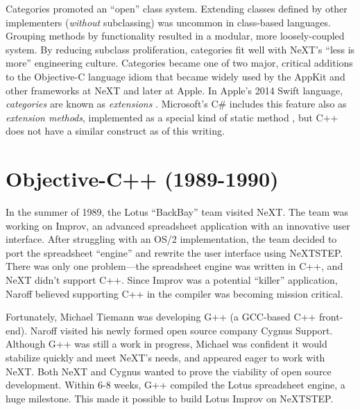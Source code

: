 \documentclass[acmsmall]{acmart}\settopmatter{}
\begin{document}
Categories promoted an ``open'' class system. Extending classes defined by other implementers (\emph{without} subclassing) was uncommon in class-based languages. Grouping methods by functionality resulted in a modular, more loosely-coupled system. By reducing subclass proliferation, categories fit well with NeXT's ``less is more'' engineering culture. Categories became one of two major, critical additions to the Objective-C language idiom that became widely used by the AppKit and other frameworks at NeXT and later at Apple. In Apple's 2014 Swift language, \emph{categories} are known as \emph{extensions} . Microsoft's C\# includes this feature also as \emph{extension methods}, implemented as a special kind of static method , but C++ does not have a similar construct as of this writing.

\section{Objective-C++ (1989-1990)}
\label{sec-ObjC++1989-1990}
In the summer of 1989, the Lotus ``BackBay'' team visited NeXT. The team was working on Improv, an advanced spreadsheet application with an innovative user interface. After struggling with an OS/2 implementation, the team decided to port the spreadsheet ``engine'' and rewrite the user interface using NeXTSTEP. There was only one problem---the spreadsheet engine was written in C++, and NeXT didn't support C++. Since Improv was a potential ``killer'' application, Naroff believed supporting C++ in the compiler was becoming mission critical.

Fortunately, Michael Tiemann was developing G++ (a GCC-based C++ front-end). Naroff visited his newly formed open source company Cygnus Support. Although G++ was still a work in progress, Michael was confident it would stabilize quickly and meet NeXT's needs, and appeared eager to work with NeXT. Both NeXT and Cygnus wanted to prove the viability of open source development. Within 6-8 weeks, G++ compiled the Lotus spreadsheet engine, a huge milestone. This made it possible to build Lotus Improv on NeXTSTEP.
\end{document}
